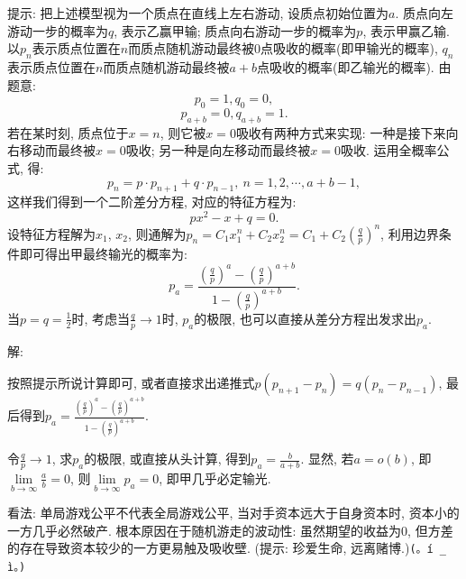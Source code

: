 \documentclass[standard]{ExBook}
\begin{document}
\begin{qitems}
\begin{bbox}
\begin{shaded}
提示: 把上述模型视为一个质点在直线上左右游动, 设质点初始位置为$a$. 质点向左游动一步的概率为$q$, 表示乙赢甲输; 质点向右游动一步的概率为$p$, 表示甲赢乙输. 以$p_{n}$表示质点位置在$n$而质点随机游动最终被0点吸收的概率(即甲输光的概率), $q_n$表示质点位置在$n$而质点随机游动最终被$a + b$点吸收的概率(即乙输光的概率). 由题意:
$$p_{0}=1,q_{0}=0,$$
$$p_{a+b}=0,q_{a+b}=1.$$
若在某时刻, 质点位于$x=n$, 则它被$x=0$吸收有两种方式来实现: 一种是接下来向右移动而最终被$x=0$吸收; 另一种是向左移动而最终被$x=0$吸收. 运用全概率公式, 得:
$$p_{n}=p\cdot p_{n+1}+q\cdot p_{n-1},\ n=1,2,\cdots,a+b-1,$$
这样我们得到一个二阶差分方程, 对应的特征方程为:
$$px^2-x+q=0.$$
设特征方程解为$x_{1}$, $x_{2}$, 则通解为$p_{n}=C_{1}x_{1}^{n}+C_{2}x_{2}^{n}=C_{1}+C_{2}\left(\frac{q}{p}\right)^{n}$, 利用边界条件即可得出甲最终输光的概率为:
$$p_{a}=\displaystyle\frac{\left(\frac{q}{p}\right)^{a}-\left(\frac{q}{p}\right)^{a+b}}{1-\left(\frac{q}{p}\right)^{a+b}}.$$
当$p=q=\frac{1}{2}$时, 考虑当$\frac{q}{p}\longrightarrow1$时, $p_{a}$的极限, 也可以直接从差分方程出发求出$p_{a}$.
    \end{shaded}
    \end{bbox}

\vspace{-5em}

    \begin{bbox}
解: 

按照提示所说计算即可, 或者直接求出递推式$p(p_{n+1}-p_{n})=q(p_{n}-p_{n-1})$, 最后得到$p_{a}=\displaystyle\frac{\left(\frac{q}{p}\right)^{a}-\left(\frac{q}{p}\right)^{a+b}}{1-\left(\frac{q}{p}\right)^{a+b}}$. 

令$\frac{q}{p}\to1$, 求$p_a$的极限, 或直接从头计算, 得到$p_a=\frac{b}{a+b}$. 显然, 若$a=o(b)$, 即$\lim\limits_{b\to\infty}\frac{a}{b}=0$, 则$\lim\limits_{b\to\infty}p_{a}=0$, 即甲几乎必定输光.
    \end{bbox}

\vspace{-5em}

    \begin{bbox}
看法: 单局游戏公平不代表全局游戏公平, 当对手资本远大于自身资本时, 资本小的一方几乎必然破产. 根本原因在于随机游走的波动性: 虽然期望的收益为0, 但方差的存在导致资本较少的一方更易触及吸收壁. (提示: 珍爱生命, 远离赌博.)\texttt{(。í \_ ì。)}
    \end{bbox}

\end{qitems}

\end{document}
